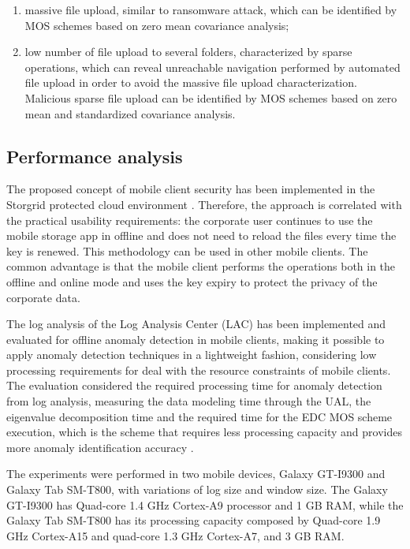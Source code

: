 \begin{enumerate}
	\item massive file upload, similar to ransomware attack, which can be identified by MOS schemes based on zero mean covariance analysis; 
	\item low number of file upload to several folders, characterized by sparse operations, which can reveal unreachable navigation performed by automated file upload in order to avoid the massive file upload characterization. Malicious sparse file upload can be identified by MOS schemes based on zero mean and standardized covariance analysis.
\end{enumerate}

\subsection{Performance analysis}
\label{sec:3_complex}

The proposed concept of mobile client security has been implemented in the Storgrid protected cloud environment \cite{storgrid2016}. Therefore, the approach is correlated with the practical usability requirements: the corporate user continues to use the mobile storage app in offline and does not need to reload the files every time the key is renewed. This methodology can be used in other mobile clients. The common advantage is that the mobile client performs the operations both in the offline and online mode and uses the key expiry to protect the privacy of the corporate data. 

The log analysis of the Log Analysis Center (LAC) has been implemented and evaluated for offline anomaly detection in mobile clients, making it possible to apply anomaly detection techniques in a lightweight fashion, considering low processing requirements for deal with the resource constraints of mobile clients. The evaluation considered the required processing time for anomaly detection from log analysis, measuring the data modeling time through the UAL, the eigenvalue decomposition time and the required time for the EDC MOS scheme execution, which is the scheme that requires less processing capacity and provides more anomaly identification accuracy \cite{da2009comparison,tenorio2013greatest}. 

The experiments were performed in two mobile devices, Galaxy GT-I9300 and Galaxy Tab SM-T800, with variations of log size and window size. The Galaxy GT-I9300 has Quad-core 1.4 GHz Cortex-A9 processor and 1 GB RAM, while the Galaxy Tab SM-T800 has its processing capacity composed by Quad-core 1.9 GHz Cortex-A15 and quad-core 1.3 GHz Cortex-A7, and 3 GB RAM.

